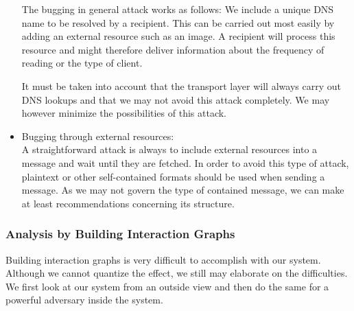 \begin{itemize}
	The bugging in general attack works as follows: We include a unique DNS name to be resolved by a recipient. This can be carried out most easily by adding an external resource such as an image. A recipient will process this resource and might therefore deliver information about the frequency of reading or the type of client. 
	
	It must be taken into account that the transport layer will always carry out DNS lookups and that we may not avoid this attack completely. We may however minimize the possibilities of this attack.
	
	\item Bugging through external resources:\\
	A straightforward attack is always to include external resources into a message and wait until they are fetched. In order to avoid this type of attack, plaintext or other self-contained formats should be used when sending a message. As we may not govern the type of contained message, we can make at least recommendations concerning its structure.
\end{itemize}

\subsubsection{Analysis by Building Interaction Graphs\label{sec:analysisInteractionGraphs}}
Building interaction graphs is very difficult to accomplish with our system. Although we cannot quantize the effect, we still may elaborate on the difficulties. We first look at our system from an outside view and then do the same for a powerful adversary inside the system.


